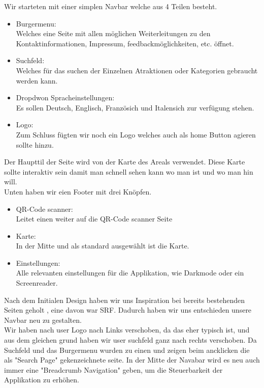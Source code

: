 \documentclass[10pt]{article}
\newcounter{subsubsubsection}[subsubsection]
\begin{document}
	Wir starteten mit einer simplen Navbar welche aus 4 Teilen besteht.
	\begin{itemize}
		\item Burgermenu:\\
		Welches eine Seite mit allen möglichen Weiterleitungen zu den Kontaktinformationen, Impressum, feedbackmöglichkeiten, etc. öffnet.
		\item  Suchfeld:\\
		Welches für das suchen der Einzelnen Atraktionen oder Kategorien gebraucht werden kann.
		\item Dropdwon Spracheinstellungen:\\
		Es sollen Deutsch, Englisch, Französich und Italensich zur verfügung stehen.
		\item  Logo:\\
		Zum Schluss fügten wir noch ein Logo welches auch als home Button agieren sollte hinzu.
	\end{itemize}
	Der Haupttil der Seite wird von der Karte des Areals verwendet. Diese Karte sollte interaktiv sein damit man schnell sehen kann wo man ist und wo man hin will.\\
	
	Unten haben wir eien Footer mit drei Knöpfen.
	\begin{itemize}
		\item QR-Code scanner:\\
		Leitet einen weiter auf die QR-Code scanner Seite
		\item  Karte:\\
		In der Mitte und als standard ausgewählt ist die Karte.
		\item Einstellungen:\\
		Alle relevanten einstellungen für die Applikation, wie Darkmode oder ein Screenreader.
	\end{itemize}
	
	Nach dem Initialen Design haben wir uns Inspiration bei bereits bestehenden Seiten geholt , eine davon war SRF. Dadurch haben wir uns entschieden unsere Navbar neu zu gestalten.\\
	Wir haben nach user Logo nach Links verschoben, da das eher typisch ist, und aus dem gleichen grund haben wir user suchfeld ganz nach rechts verschoben. Da Suchfeld und das Burgermenu wurden zu einen und zeigen beim ancklicken die als "Search Page" gekenzeichnete seite. In der Mitte der Navabar wird es neu auch immer eine "Breadcrumb Navigation" geben, um die Steuerbarkeit der Applikation zu erhöhen.\\
	
\end{document}
